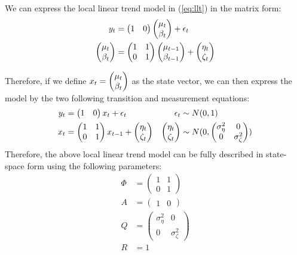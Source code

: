 We can express the local linear trend model in (\ref{eq:llt}) in the matrix form:
\begin{equation}
\begin{split}
y_t &= \begin{pmatrix}1 & 0\end{pmatrix}\colvec{\mu_t}{\beta_t} + \epsilon_t\\
\colvec{\mu_t}{\beta_t} &= \begin{pmatrix}1 & 1\\0 & 1\end{pmatrix} \colvec{\mu_{t-1}}{\beta_{t-1}} +  \colvec{\eta_t}{\zeta_t}
\end{split}
\end{equation}

Therefore, if we define $x_t = \colvec{\mu_t}{\beta_t}$ as the state vector, we can then express the model by the two following transition and measurement equations:
\begin{align*}
y_t &= \begin{pmatrix}1 & 0\end{pmatrix} x_t + \epsilon_t & \epsilon_t &\sim N(0, 1)\\
x_t &= \begin{pmatrix}1 & 1\\0 & 1\end{pmatrix} x_{t-1} +  \colvec{\eta_t}{\zeta_t} & \colvec{\eta_t}{\zeta_t} &\sim N(0, \begin{pmatrix}\sigma_\eta^2 & 0\\0 & \sigma_\zeta^2\end{pmatrix})
\end{align*}
Therefore, the above local linear trend model can be fully described in state-space form using the following parameters:
\begin{equation} \label{eq:statespace_para}
\begin{split}
\Phi &= \begin{pmatrix}1 & 1\\0 & 1\end{pmatrix}\\
A &=  \begin{pmatrix}1 & 0\end{pmatrix}\\
Q &= \begin{pmatrix}\sigma_\eta^2 & 0\\0 & \sigma_\zeta^2\end{pmatrix} \\
R &= 1
\end{split}
\end{equation}
